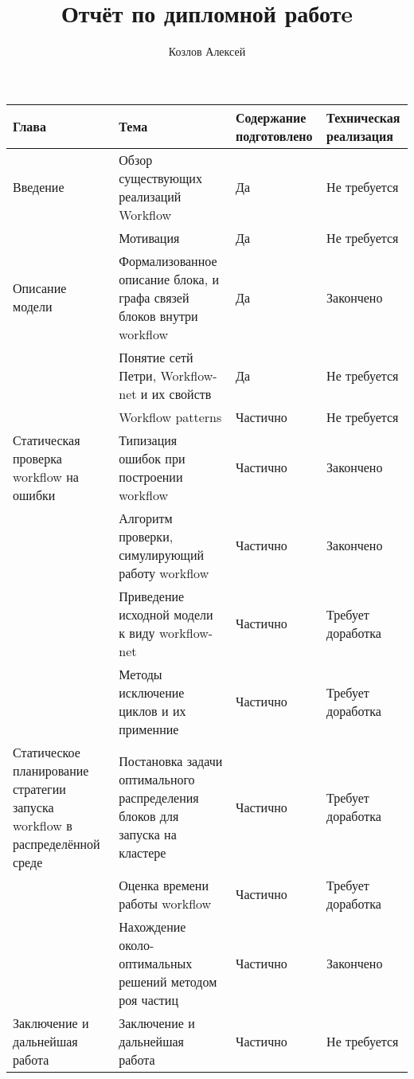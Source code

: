 \documentclass[a4paper,12pt]{article}
\title{Отчёт по дипломной работe}
\author{Козлов Алексей}
\begin{document}
\maketitle
\textwidth 17.5cm
\topmargin -1cm
\parindent 1cm
\textheight 24cm
\parskip 1.5mm


\begin{table}[ht]
\centering 
    \begin{tabular}{|>{\centering}m{3.5cm}| >{\centering}m{5cm} |>{\centering}m{2.7cm}|l|}
     \hline
    Глава & Тема & Содержание подготовлено & Техническая реализация  \\ [0.5ex] \hline \hline
    Введение                       & Обзор существующих реализаций Workflow                                & Да       & Не требуется  \\ \hline
    ~							   & Мотивация 	                							               & Да       & Не требуется  \\ \hline
    Описание  модели               & Формализованное описание блока, и графа связей блоков внутри workflow & Да       & Закончено \\ \hline
    ~				               & Понятие сетй Петри, Workflow-net и их свойств	                       & Да       & Не требуется \\ \hline
    ~				               & Workflow patterns                                                	   & Частично & Не требуется \\ \hline
    Статическая проверка workflow 
    				  на ошибки    & Типизация ошибок при построении workflow                              & Частично & Закончено   \\ \hline
    				               & Алгоритм проверки, симулирующий работу workflow                       & Частично & Закончено   \\ \hline
    ~                              & Приведение исходной модели к виду workflow-net     				   & Частично & Требует доработка   \\ \hline
    ~                              & Методы исключение циклов и их применние                               & Частично & Требует доработка \\ \hline
    Статическое планирование 
    стратегии запуска workflow 
    в распределённой среде         & Постановка задачи оптимального распределения блоков для запуска 
    																					 на кластере       & Частично & Требует доработка   \\ \hline
    ~                              & Оценка времени работы workflow									       & Частично & Требует доработка   \\ \hline    	
    ~                              & Нахождение около-оптимальных решений методом роя частиц               & Частично & Закончено   \\ \hline
    Заключение и дальнейшая работа & Заключение и дальнейшая работа                                        & Частично & Не требуется \\ \hline
    \end{tabular}
\end{table}
\end{document}
